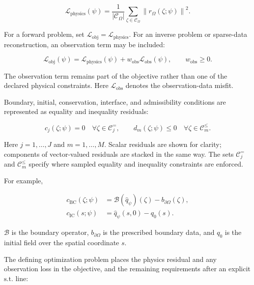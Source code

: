 \documentclass[a4paper]{article}
\begin{document}
\begin{equation}
\mathcal L_{\mathrm{physics}}(\psi)
=
\frac{1}{|\mathcal C_\Omega|}
\sum_{\zeta\in\mathcal C_\Omega}
\left\|
r_\Omega(\zeta;\psi)
\right\|^2.
\end{equation}

For a forward problem, set
$\mathcal L_{\mathrm{obj}}=\mathcal L_{\mathrm{physics}}$. For an inverse
problem or sparse-data reconstruction, an observation term may be included:

\begin{equation}
\mathcal L_{\mathrm{obj}}(\psi)
=
\mathcal L_{\mathrm{physics}}(\psi)
+
w_{\mathrm{obs}}\mathcal L_{\mathrm{obs}}(\psi),
\qquad
w_{\mathrm{obs}}\ge0.
\end{equation}

The observation term remains part of the objective rather than one of the
declared physical constraints. Here $\mathcal L_{\mathrm{obs}}$ denotes the
observation-data misfit.

Boundary, initial, conservation, interface, and admissibility conditions are
represented as equality and inequality residuals:

\begin{equation}
c_j(\zeta;\psi)=0
\quad \forall\zeta\in\mathcal C_j^{=},
\qquad
d_m(\zeta;\psi)\le0
\quad \forall\zeta\in\mathcal C_m^{\le}.
\end{equation}

Here $j=1,\ldots,J$ and $m=1,\ldots,M$. Scalar residuals are shown for
clarity; components of vector-valued residuals are stacked in the same way.
The sets $\mathcal C_j^{=}$ and $\mathcal C_m^{\le}$ specify where sampled
equality and inequality constraints are enforced.

For example,

\begin{equation}
\begin{aligned}
c_{\mathrm{BC}}(\zeta;\psi)
&=
\mathcal B\!\left(\widehat q_\psi\right)(\zeta)
-
b_{\partial\Omega}(\zeta),\\
c_{\mathrm{IC}}(s;\psi)
&=
\widehat q_\psi(s,0)-q_0(s).
\end{aligned}
\end{equation}

$\mathcal B$ is the boundary operator, $b_{\partial\Omega}$ is the prescribed
boundary data, and $q_0$ is the initial field over the spatial coordinate $s$.

The defining optimization problem places the physics residual and any
observation loss in the objective, and the remaining requirements after an
explicit $\mathrm{s.t.}$ line:
\end{document}
